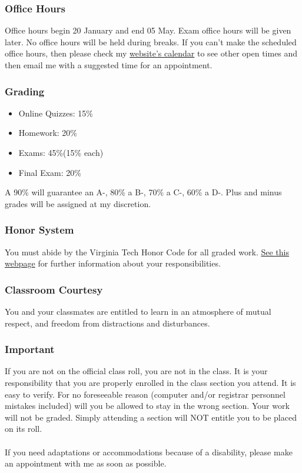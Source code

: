 \documentclass{article}
\begin{document}
			\subsubsection*{Office Hours} 
			Office hours begin 20 January and end 05 May. Exam office hours will
			be given later. No office hours will be held during breaks.  If you can't
			make the scheduled office hours, then please check my \href{http://www.math.vt.edu/people/erichlf/}{website's calendar} to see
			other open times and then email me with a suggested time for an
			appointment. 
			
			\subsubsection*{Grading} 
			\begin{itemize}
				\item   Online Quizzes:	15\%
				\item   Homework:	20\%
				\item   Exams:	45\%(15\% each)
				\item   Final Exam:	20\%
			\end{itemize}
			A 90\% will guarantee an A-, 80\% a B-, 70\% a C-, 60\% a D-.
			Plus and minus grades will be assigned at my discretion.
			
			\subsubsection*{Honor System} 
			You must abide by the Virginia Tech Honor Code for all graded work.  \href{http://www.emporium.vt.edu/math1205/resources/honorpolicy.html}{See
			this webpage} for further information about your responsibilities.
			
			\subsubsection*{Classroom Courtesy} 
			You and your classmates are entitled to learn in an atmosphere of mutual
			respect, and freedom from distractions and disturbances. 
		
			
		 
			\subsubsection*{Important} 
			If you are not on the official class roll, you are not in the class.  It
			is your responsibility that you are properly enrolled in the class section
			you attend.  It is easy to verify.  For no foreseeable reason (computer
			and/or registrar personnel mistakes included) will you be allowed to stay
			in the wrong section.  Your work will not be graded.  Simply attending a
			section will NOT entitle you to be placed on its roll. \\ \\
			If you need adaptations or accommodations because of a disability, please
			make an appointment with me as soon as possible.
		
\end{document}
